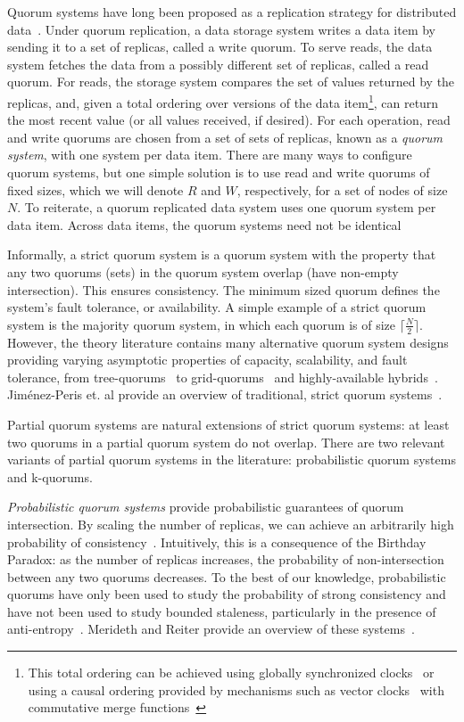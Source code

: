 \documentclass{vldb}
\begin{document}
Quorum systems have long been proposed as a replication strategy for
distributed data~\cite{quorums-start}.  Under quorum replication, a
data storage system writes a data item by sending it to a set of
replicas, called a write quorum.  To serve reads, the data system
fetches the data from a possibly different set of replicas, called a
read quorum.  For reads, the storage system compares the set of values
returned by the replicas, and, given a total ordering over versions of
the data item\footnote{This total ordering can be achieved using
  globally synchronized clocks~\cite{synch-clocks} or using a causal
  ordering provided by mechanisms such as vector
  clocks~\cite{vectorclock} with commutative merge
  functions~\cite{cops}}, can return the most recent value (or all
values received, if desired).  For each operation, read and write
quorums are chosen from a set of sets of replicas, known as a
\textit{quorum system}, with one system per data item.  There are many
ways to configure quorum systems, but one simple solution is to use
read and write quorums of fixed sizes, which we will denote $R$ and
$W$, respectively, for a set of nodes of size $N$.  To reiterate, a
quorum replicated data system uses one quorum system per data item.
Across data items, the quorum systems need not be identical

Informally, a strict quorum system is a quorum system with the
property that any two quorums (sets) in the quorum system overlap
(have non-empty intersection). This ensures consistency.  The minimum
sized quorum defines the system's fault tolerance, or availability.  A
simple example of a strict quorum system is the majority quorum
system, in which each quorum is of size $\lceil \frac{N}{2}\rceil$.
However, the theory literature contains many alternative quorum system
designs providing varying asymptotic properties of capacity,
scalability, and fault tolerance, from tree-quorums~\cite{treequorum}
to grid-quorums~\cite{quorumsystems} and highly-available
hybrids~\cite{92-quorums}.  Jim\'{e}nez-Peris et. al provide an
overview of traditional, strict quorum
systems~\cite{quorums-alternative}.

Partial quorum systems are natural extensions of strict quorum
systems: at least two quorums in a partial quorum system do not
overlap.  There are two relevant variants of partial quorum systems in
the literature: probabilistic quorum systems and k-quorums.

\textit{Probabilistic quorum systems} provide probabilistic guarantees
of quorum intersection.  By scaling the number of replicas, we can
achieve an arbitrarily high probability of
consistency~\cite{prob-quorum}.  Intuitively, this is a consequence of
the Birthday Paradox: as the number of replicas increases, the
probability of non-intersection between any two quorums decreases.  To
the best of our knowledge, probabilistic quorums have only been used
to study the probability of strong consistency and have not been used
to study bounded staleness, particularly in the presence of
anti-entropy~\cite{antientropy}.  Merideth and Reiter provide an
overview of these systems~\cite{quorum-overview}.
\end{document}
